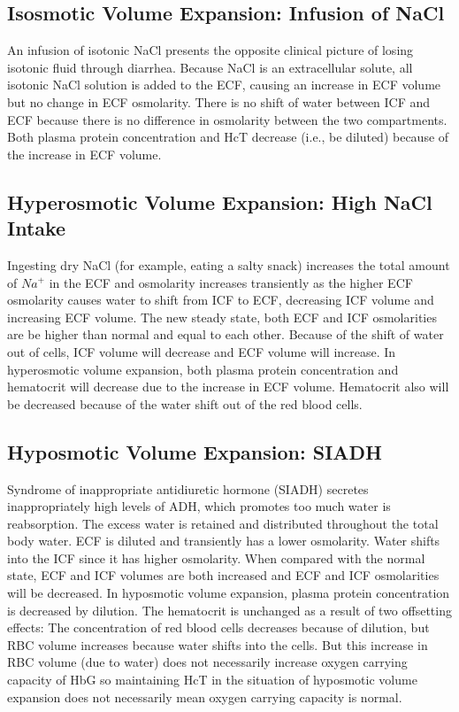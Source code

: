 \subsection{Isosmotic Volume Expansion: Infusion of NaCl} 

An infusion of isotonic NaCl presents the opposite clinical picture of losing isotonic fluid through diarrhea. Because NaCl is an extracellular solute, all isotonic NaCl solution is added to the ECF, causing an increase in ECF volume but no change in ECF osmolarity. There is no shift of water between ICF and ECF because there is no difference in osmolarity between the two compartments. Both plasma protein concentration and HcT decrease (i.e., be diluted) because of the increase in ECF volume. 

\subsection{Hyperosmotic Volume Expansion: High NaCl Intake} 

Ingesting dry NaCl (for example, eating a salty snack) increases the total amount of $Na^+$ in the ECF and osmolarity increases transiently as the higher ECF osmolarity causes water to shift from ICF to ECF, decreasing ICF volume and increasing ECF volume. The new steady state, both ECF and ICF osmolarities are be higher than normal and equal to each other. Because of the shift of water out of cells, ICF volume will decrease and ECF volume will increase. In hyperosmotic volume expansion, both plasma protein concentration and hematocrit will decrease due to the increase in ECF volume. Hematocrit also will be decreased because of the water shift out of the red blood cells. 

\subsection{Hyposmotic Volume Expansion: SIADH} 

Syndrome of inappropriate antidiuretic hormone (SIADH) secretes inappropriately high levels of ADH, which promotes too much water is reabsorption. The excess water is retained and distributed throughout the total body water. ECF is diluted and transiently has a lower osmolarity. Water shifts into the ICF since it has higher osmolarity. When compared with the normal state, ECF and ICF volumes are both increased and ECF and ICF osmolarities will be decreased. In hyposmotic volume expansion, plasma protein concentration is decreased by dilution. The hematocrit is unchanged as a result of two offsetting effects: The concentration of red blood cells decreases because of dilution, but RBC volume increases because water shifts into the cells. But this increase in RBC volume (due to water) does not necessarily increase oxygen carrying capacity of HbG so maintaining HcT in the situation of hyposmotic volume expansion does not necessarily mean oxygen carrying capacity is normal.





